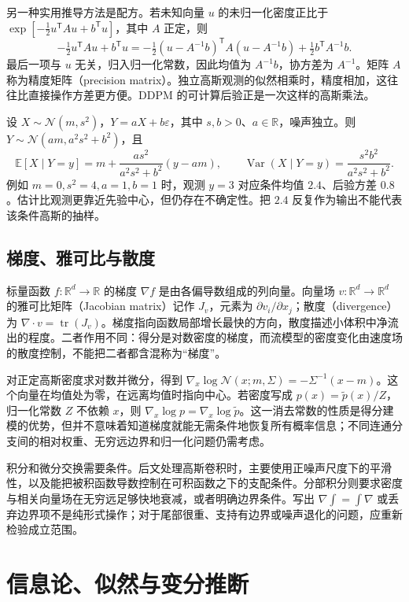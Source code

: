 \documentclass[UTF8,12pt,a4paper,fontset=fandol]{ctexart}
\begin{document}
另一种实用推导方法是配方。若未知向量 $u$ 的未归一化密度正比于 $\exp[-\tfrac12 u^\mathsf T A u+b^\mathsf T u]$，其中 $A$ 正定，则
\[
 -\tfrac12 u^\mathsf T A u+b^\mathsf T u
 =-\tfrac12(u-A^{-1}b)^\mathsf T A(u-A^{-1}b)+\tfrac12b^\mathsf T A^{-1}b.
\]
最后一项与 $u$ 无关，归入归一化常数，因此均值为 $A^{-1}b$，协方差为 $A^{-1}$。矩阵 $A$ 称为精度矩阵（precision matrix）。独立高斯观测的似然相乘时，精度相加，这往往比直接操作方差更方便。DDPM 的可计算后验正是一次这样的高斯乘法。

\begin{example}[一次线性高斯去噪]
\label{ex:diff-scalar-gaussian}
设 $X\sim\mathcal N(m,s^2)$，$Y=aX+b\varepsilon$，其中 $s,b>0$、$a\in\mathbb R$，噪声独立。则 $Y\sim\mathcal N(am,a^2s^2+b^2)$，且
\[
 \mathbb E[X\mid Y=y]=m+\frac{as^2}{a^2s^2+b^2}(y-am),\qquad
 \operatorname{Var}(X\mid Y=y)=\frac{s^2b^2}{a^2s^2+b^2}.
\]
例如 $m=0,s^2=4,a=1,b=1$ 时，观测 $y=3$ 对应条件均值 $2.4$、后验方差 $0.8$。估计比观测更靠近先验中心，但仍存在不确定性。把 $2.4$ 反复作为输出不能代表该条件高斯的抽样。
\end{example}

\subsection{梯度、雅可比与散度}
标量函数 $f:\mathbb R^d\to\mathbb R$ 的梯度 $\nabla f$ 是由各偏导数组成的列向量。向量场 $v:\mathbb R^d\to\mathbb R^d$ 的雅可比矩阵（Jacobian matrix）记作 $J_v$，元素为 $\partial v_i/\partial x_j$；散度（divergence）为 $\nabla\cdot v=\operatorname{tr}(J_v)$。梯度指向函数局部增长最快的方向，散度描述小体积中净流出的程度。二者作用不同：得分是对数密度的梯度，而流模型的密度变化由速度场的散度控制，不能把二者都含混称为“梯度”。

对正定高斯密度求对数并微分，得到 $\nabla_x\log\mathcal N(x;m,\Sigma)=-\Sigma^{-1}(x-m)$。这个向量在均值处为零，在远离均值时指向中心。若密度写成 $p(x)=\widetilde p(x)/Z$，归一化常数 $Z$ 不依赖 $x$，则 $\nabla_x\log p=\nabla_x\log\widetilde p$。这一消去常数的性质是得分建模的优势，但并不意味着知道梯度就能无需条件地恢复所有概率信息；不同连通分支间的相对权重、无穷远边界和归一化问题仍需考虑。

积分和微分交换需要条件。后文处理高斯卷积时，主要使用正噪声尺度下的平滑性，以及能把被积函数导数控制在可积函数之下的支配条件。分部积分则要求密度与相关向量场在无穷远足够快地衰减，或者明确边界条件。写出 $\nabla\int=\int\nabla$ 或丢弃边界项不是纯形式操作；对于尾部很重、支持有边界或噪声退化的问题，应重新检验成立范围。

\section{信息论、似然与变分推断}
\label{sec:diff-information}
\end{document}
